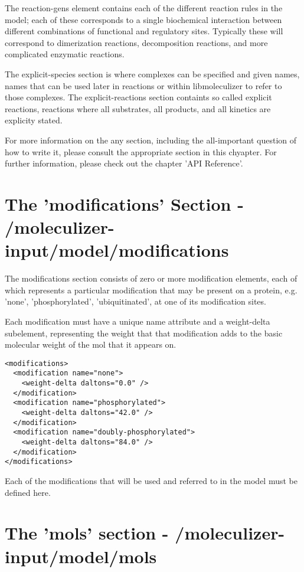 The reaction-gens element contains each of the different reaction
rules in the model; each of these corresponds to a single biochemical
interaction between different combinations of functional and
regulatory sites.  Typically these will correspond to dimerization
reactions, decomposition reactions, and more complicated enzymatic
reactions. 
 
The explicit-species section is where complexes can be specified and
given names, names that can be used later in reactions or within
libmoleculizer to refer to those complexes.  The explicit-reactions
section containts so called explicit reactions, reactions where all
substrates, all products, and all kinetics are explicity stated.  

For more information on the any section, including the all-important
question of how to write it, please consult the appropriate section in
this chyapter.  For further information, please check out the chapter
'API Reference'.  

\section{The 'modifications' Section -
  /moleculizer-input/model/modifications } 
\label{sec:modifications}

The modifications section consists of zero or more modification elements,
each of which represents a particular modification that may be present
on a protein, e.g. 'none', 'phosphorylated', 'ubiquitinated', at one
of its modification sites.

Each modification must have a unique name attribute and a weight-delta
subelement, representing the weight that that modification adds to the
basic molecular weight of the mol that it appears on.  

\lstset{language=XML}
\begin{lstlisting}[caption=A Sample Modifications Section, label=modifications ]
<modifications>
  <modification name="none">
    <weight-delta daltons="0.0" />
  </modification>
  <modification name="phosphorylated">
    <weight-delta daltons="42.0" />
  </modification>
  <modification name="doubly-phosphorylated">
    <weight-delta daltons="84.0" />
  </modification>
</modifications>
\end{lstlisting}

Each of the modifications that will be used and referred to in the
model must be defined here. 

\section{The 'mols' section - /moleculizer-input/model/mols}

